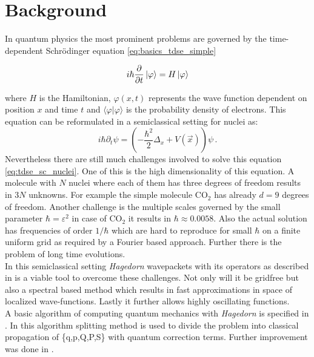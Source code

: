 \section{Background}
\label{seq:background}

In quantum physics the most prominent problems are governed by the time-dependent
Schr\"odinger equation \ref{eq:basics_tdse_simple}

\begin{equation} \label{eq:basics_tdse_simple}
  i \hbar \frac{\partial}{\partial t} \Ket{\varphi} = H \Ket{\varphi}
\end{equation}

where $H$ is the Hamiltonian, $\varphi(x,t)$ represents the wave function dependent on position $x$ and
time $t$ and $\langle \varphi | \varphi  \rangle$ is the probability density of electrons. This equation can be reformulated in a semiclassical setting for nuclei as: \
\begin{equation}
\label{eq:tdse_sc_nuclei}
 i\hbar \partial_{t}\psi = \left( -\frac{\hbar^{2}}{2} \Delta_{x} + V(\vec{x}) \right) \psi\,.
\end{equation}
Nevertheless there are still much challenges involved to solve this equation \ref{eq:tdse_sc_nuclei}. One of this is the high dimensionality of this equation. A molecule with $N$ nuclei where each of them has three degrees of freedom results in $3N$ unknowns. For example the simple molecule $\mathrm{CO_{2}}$ has already $d=9$ degrees of freedom. Another challenge is the multiple scales governed by the small parameter $\hbar = \varepsilon^{2}$ in case of $\mathrm{CO_{2}}$ it results in $\hbar \approx 0.0058$. Also the actual solution has frequencies of order $1/\hbar$ which are hard to reproduce for small $\hbar$ on a finite uniform grid as required by a Fourier based approach. Further there is the problem of long time evolutions.\\

In this semiclassical setting \textit{Hagedorn} wavepackets with its operators as described in \cite{H_ladder_operators} is a viable tool to overcome these challenges. Not only will it be gridfree but also a spectral based method which results in fast approximations in space of localized wave-functions. Lastly it further allows highly oscillating functions.\\


A basic algorithm of computing quantum mechanics with \textit{Hagedorn} is specified in \cite{FGL_semiclassical_dynamics}. In this algorithm splitting method is used to divide the problem into classical propagation of \{q,p,Q,P,S\} with quantum correction terms.
Further improvement was done in \cite{GH_convsemiclassical}.\\

